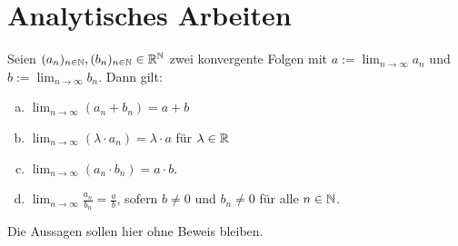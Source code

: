 \section{Analytisches Arbeiten}


\begin{satz} \label{konvergenzregeln}
    Seien $(a_n)_{n\in \mathbb N},(b_n)_{n\in \mathbb N}\in \mathbb R^\mathbb N$ zwei konvergente Folgen mit $a:=\lim_{n\to\infty}a_n$ und $b:=\lim_{n\to\infty}b_n$. Dann gilt:
    \begin{enumerate}[a)]
        \item $\lim_{n\to\infty}(a_n+b_n)=a+b$
        \item $\lim_{n\to\infty}(\lambda \cdot a_n)=\lambda \cdot a$ für $\lambda\in\mathbb R$
        \item $\lim_{n\to\infty}(a_n\cdot b_n)=a\cdot b$.
        \item $\lim_{n\to\infty}\frac{a_n}{b_n} = \frac{a}{b}$, sofern $b\neq 0$ und $b_n\neq 0$ für alle $n\in \mathbb N$.
    \end{enumerate}
\end{satz}


\begin{bew}
    Die Aussagen sollen hier ohne Beweis bleiben.%
\end{bew}


